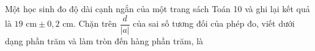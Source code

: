 \begin{ex}
Một học sinh đo độ dài cạnh ngắn của một trang sách Toán 10 và ghi lại kết quả là $19\text{ cm}\pm0{,}2\text{ cm}$. Chặn trên $\dfrac{d}{|a|}$ của sai số tương đối của phép đo, viết dưới dạng phần trăm và làm tròn đến hàng phần trăm, là
\end{ex}
